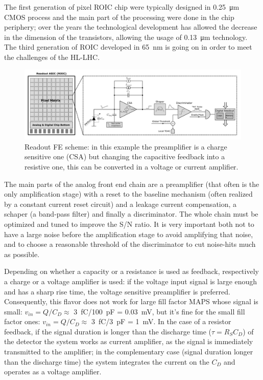    The first generation of pixel ROIC chip were typically designed in \SI{0.25}{\um} CMOS process and the main part of the processing were done in the chip periphery; over the years the technological development has allowed the decrease in the dimension of the transistors, allowing the usage of \SI{0.13}{\um} technology. The third generation of ROIC developed in \SI{65}{nm} is going on in order to meet the challenges of the HL-LHC.
   \begin{figure}
      \centering
      \includegraphics[width=1.\linewidth]{figures/Pixel_detectors/readout_scheme.png}
      \caption{Readout FE scheme: in this example the preamplifier is a charge sensitive one (CSA) but changing the capacitive feedback into a resistive one, this can be converted in a voltage or current amplifier.}
      \label{fig:readout_scheme}
   \end{figure}
   The main parts of the analog front end chain are a preamplifier (that often is the only amplification stage) with a reset to the baseline mechanism (often realized by a constant current reset circuit) and a leakage current compensation, a schaper (a band-pass filter) and finally a discriminator. The whole chain must be optimized and tuned to improve the S/N ratio. It is very important both not to have a large noise before the amplification stage to avoid amplifying that noise, and to choose a reasonable threshold of the discriminator to cut noise-hits much as possible.

   Depending on whether a capacity or a resistance is used as feedback, respectively a charge or a voltage amplifier is used: if the voltage input signal is large enough and has a sharp rise time, the voltage sensitive preamplifier is preferred. Consequently, this flavor does not work for large fill factor MAPS whose signal is small: $v_{in} = Q/C_{D} \approx$ \SI{3}{fC}/\SI{100}{pF} = \SI{0.03}{mV}, but it's fine for the small fill factor ones: $v_{in} = Q/C_{D} \approx$ \SI{3}{fC}/\SI{3}{pF} = \SI{1}{mV}.
   In the case of a resistor feedback, if the signal duration is longer than the discharge time ($\tau=R_S C_D$) of the detector the system works as current amplifier, as the signal is immediately transmitted to the amplifier; in the complementary case (signal duration longer than the discharge time) the system integrates the current on the $C_D$ and operates as a voltage amplifier.
   
